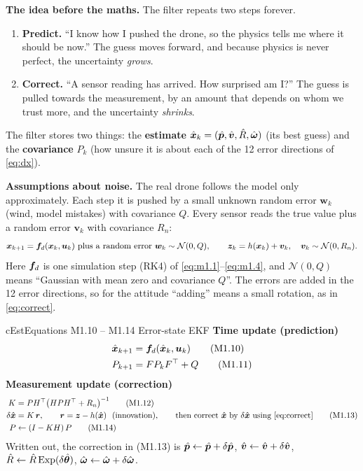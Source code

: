 \begin{keybox}
\textbf{The idea before the maths.} The filter repeats two steps forever.
\begin{enumerate}[leftmargin=*]
  \item \textbf{Predict.} ``I know how I pushed the drone, so the physics tells me where it should be now.''
        The guess moves forward, and because physics is never perfect, the uncertainty \emph{grows}.
  \item \textbf{Correct.} ``A sensor reading has arrived. How surprised am I?'' The guess is pulled towards the
        measurement, by an amount that depends on whom we trust more, and the uncertainty \emph{shrinks}.
\end{enumerate}
The filter stores two things: the \textbf{estimate} $\hat{\bm x}_k=(\hat{\bm p},\hat{\bm v},\hat{R},\hat{\bm\omega})$ (its best guess) and the
\textbf{covariance} $P_k$ (how unsure it is about each of the 12 error directions of \eqref{eq:dx}).
\end{keybox}

\textbf{Assumptions about noise.} The real drone follows the model only approximately. Each step it is pushed by
a small unknown random error $\bm w_k$ (wind, model mistakes) with covariance $Q$. Every sensor reads the true
value plus a random error $\bm v_k$ with covariance $R_n$:
\[
  \bm{x}_{k+1}=\bm{f}_d(\bm{x}_k,\bm{u}_k)\ \text{plus a random error }\bm w_k\sim\mathcal N(0,Q),\qquad
  \bm{z}_k=h(\bm{x}_k)+\bm v_k,\quad \bm v_k\sim\mathcal N(0,R_n).
\]
Here $\bm{f}_d$ is one simulation step (RK4) of \eqref{eq:m1.1}--\eqref{eq:m1.4}, and $\mathcal N(0,Q)$ means ``Gaussian
with mean zero and covariance $Q$''. The errors are added in the 12 error directions, so for the attitude
``adding'' means a small rotation, as in \eqref{eq:correct}.

\begin{eqbox}{cEst}{Equations M1.10 -- M1.14 \quad Error-state EKF}
\textbf{Time update (prediction)}
\begin{align}
  \hat{\bm x}_{k+1} &= \bm{f}_d(\hat{\bm x}_k,\bm{u}_k) \tag{M1.10}\label{eq:m1.10}\\
  P_{k+1}   &= F P_k F^\top + Q \tag{M1.11}\label{eq:m1.11}
\end{align}
\textbf{Measurement update (correction)}
\begin{align}
  K   &= P H^\top\big(HPH^\top+R_n\big)^{-1} \tag{M1.12}\label{eq:m1.12}\\
  \delta\hat{\vx} &= K\,\vr,\qquad \vr=\vz-h(\hx)\ \ \text{(innovation)},\qquad
  \text{then correct } \hx \text{ by } \delta\hat{\vx} \text{ using \eqref{eq:correct}} \tag{M1.13}\label{eq:m1.13}\\
  P   &\leftarrow (I-KH)\,P \tag{M1.14}\label{eq:m1.14}
\end{align}
Written out, the correction in (M1.13) is
$\hat{\bm p}\leftarrow\hat{\bm p}+\delta\hat{\bm{p}}$, $\hat{\bm v}\leftarrow\hat{\bm v}+\delta\hat{\bm{v}}$, $\hat{R}\leftarrow\hat{R}\,\mathrm{Exp}(\delta\hat{\bm{\theta}})$,
$\hat{\bm\omega}\leftarrow\hat{\bm\omega}+\delta\hat{\bm{\omega}}$.
\end{eqbox}

